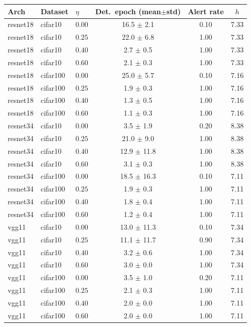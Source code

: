 \begin{tabular}{lllccc}
\toprule
Arch & Dataset & $\eta$ & Det.\ epoch (mean$\pm$std) & Alert rate & $h$ \\
\midrule
resnet18 & cifar10 & $0.00$ & 16.5 $\pm$ 2.1 & 0.10 & 7.33 \\
resnet18 & cifar10 & $0.25$ & 22.0 $\pm$ 6.8 & 1.00 & 7.33 \\
resnet18 & cifar10 & $0.40$ & 2.7 $\pm$ 0.5 & 1.00 & 7.33 \\
resnet18 & cifar10 & $0.60$ & 2.1 $\pm$ 0.3 & 1.00 & 7.33 \\
resnet18 & cifar100 & $0.00$ & 25.0 $\pm$ 5.7 & 0.10 & 7.16 \\
resnet18 & cifar100 & $0.25$ & 1.9 $\pm$ 0.3 & 1.00 & 7.16 \\
resnet18 & cifar100 & $0.40$ & 1.3 $\pm$ 0.5 & 1.00 & 7.16 \\
resnet18 & cifar100 & $0.60$ & 1.1 $\pm$ 0.3 & 1.00 & 7.16 \\
resnet34 & cifar10 & $0.00$ & 3.5 $\pm$ 1.9 & 0.20 & 8.38 \\
resnet34 & cifar10 & $0.25$ & 21.0 $\pm$ 9.0 & 1.00 & 8.38 \\
resnet34 & cifar10 & $0.40$ & 12.9 $\pm$ 11.8 & 1.00 & 8.38 \\
resnet34 & cifar10 & $0.60$ & 3.1 $\pm$ 0.3 & 1.00 & 8.38 \\
resnet34 & cifar100 & $0.00$ & 18.5 $\pm$ 16.3 & 0.10 & 7.11 \\
resnet34 & cifar100 & $0.25$ & 1.9 $\pm$ 0.3 & 1.00 & 7.11 \\
resnet34 & cifar100 & $0.40$ & 1.8 $\pm$ 0.4 & 1.00 & 7.11 \\
resnet34 & cifar100 & $0.60$ & 1.2 $\pm$ 0.4 & 1.00 & 7.11 \\
vgg11 & cifar10 & $0.00$ & 13.0 $\pm$ 11.3 & 0.10 & 7.34 \\
vgg11 & cifar10 & $0.25$ & 11.1 $\pm$ 11.7 & 0.90 & 7.34 \\
vgg11 & cifar10 & $0.40$ & 3.2 $\pm$ 0.6 & 1.00 & 7.34 \\
vgg11 & cifar10 & $0.60$ & 3.0 $\pm$ 0.0 & 1.00 & 7.34 \\
vgg11 & cifar100 & $0.00$ & 3.5 $\pm$ 1.0 & 0.20 & 7.11 \\
vgg11 & cifar100 & $0.25$ & 2.1 $\pm$ 0.3 & 1.00 & 7.11 \\
vgg11 & cifar100 & $0.40$ & 2.0 $\pm$ 0.0 & 1.00 & 7.11 \\
vgg11 & cifar100 & $0.60$ & 2.0 $\pm$ 0.0 & 1.00 & 7.11 \\
\bottomrule
\end{tabular}
